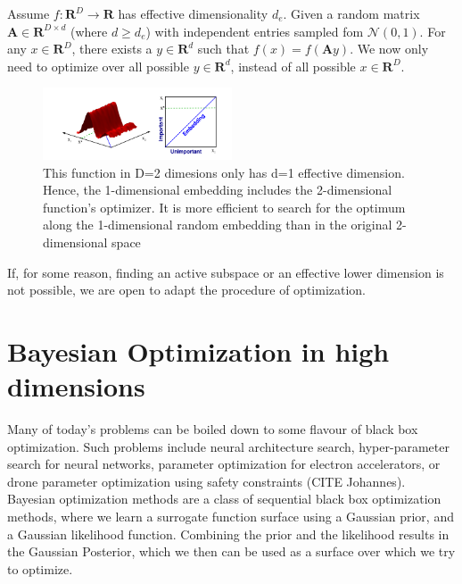 \documentclass[a4paper,12pt,twoside,openright]{report}
\begin{document}
\begin{enumerate}
Assume $ f : \mathbf{R}^D \rightarrow \mathbf{R} $ has effective dimensionality $d_e$.
Given a random matrix $ \mathbf{A} \in \mathbf{R}^{D \times d} $ (where $d \geq d_e$) with independent entries sampled fom $ \mathcal{N}(0, 1) $.
For any $ x \in \mathbf{R}^D $, there exists a $y \in \mathbf{R}^d $ such that $ f(x) = f(\mathbf{A} y ) $.
We now only need to optimize over all possible $y \in \mathbf{R}^d$, instead of all possible $x \in \mathbf{R}^D $.


\begin{figure}[h]
\centering
\includegraphics[width=0.5\textwidth]{./figs/src/Embedding_optimization.png}
\caption{ This function in D=2 dimesions only has d=1 effective dimension. Hence, the 1-dimensional embedding includes the 2-dimensional function’s optimizer. It is more efficient to search for the optimum along the 1-dimensional random embedding than in the original 2-dimensional space}
\end{figure}

\end{enumerate}

If, for some reason, finding an active subspace or an effective lower dimension is not possible, we are open to adapt the procedure of optimization.

\chapter{Bayesian Optimization in high dimensions}

Many of today's problems can be boiled down to some flavour of black box optimization. 
Such problems include neural architecture search, hyper-parameter search for neural networks, parameter optimization for electron accelerators, or drone parameter optimization using safety constraints (CITE Johannes). \\

Bayesian optimization methods are a class of sequential black box optimization methods, where we learn a surrogate function surface using a Gaussian prior, and a Gaussian likelihood function.
Combining the prior and the likelihood results in the Gaussian Posterior, which we then can be used as a surface over which we try to optimize. \\
\end{document}
